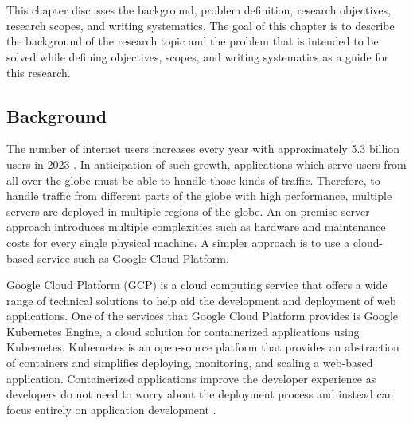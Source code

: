 \chapter{\babSatu}
\label{bab:1}
This chapter discusses the background, problem definition, research objectives, research scopes, and writing systematics. The goal of this chapter is to describe the background of the research topic and the problem that is intended to be solved while defining objectives, scopes, and writing systematics as a guide for this research.

\section{Background}
\label{sec:background}
The number of internet users increases every year with approximately 5.3 billion users in 2023 \citep{cisco-2020}. In anticipation of such growth, applications which serve users from all over the globe must be able to handle those kinds of traffic. Therefore, to handle traffic from different parts of the globe with high performance, multiple servers are deployed in multiple regions of the globe. An on-premise server approach introduces multiple complexities such as hardware and maintenance costs for every single physical machine. A simpler approach is to use a cloud-based service such as Google Cloud Platform.

Google Cloud Platform (GCP) is a cloud computing service that offers a wide range of technical solutions to help aid the development and deployment of web applications. One of the services that Google Cloud Platform provides is Google Kubernetes Engine, a cloud solution for containerized applications using Kubernetes. Kubernetes is an open-source platform that provides an abstraction of containers and simplifies deploying, monitoring, and scaling a web-based application. Containerized applications improve the developer experience as developers do not need to worry about the deployment process and instead can focus entirely on application development \citep{xie-2020}. 

